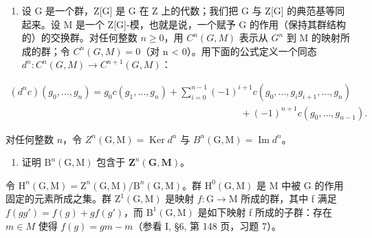 
\begin{enumerate}
\def\labelenumi{\arabic{enumi})}
\tightlist
\item
  设 G 是一个群，Z{[}G{]} 是 G 在 Z 上的代数；我们把 G 与 Z{[}G{]} 的典范基等同起来。设 M 是一个 Z{[}G{]}-模，也就是说，一个赋予 G 的作用（保持其群结构的）的交换群。对任何整数 \(n \geqslant 0\)，用 \(C^{n}(G, M)\) 表示从 \(G^{n}\) 到 M 的映射所成的群；令 \(C^{n}(G, M) = 0\)（对 n \textless{} 0）。用下面的公式定义一个同态 \(d^{n}: C^{n}(G, M) \to C^{n+1}(G, M)\)：
\end{enumerate}

\[
\begin{array}{c} (d ^ {n} c) (g _ {0}, \ldots , g _ {n}) = g _ {0}   c (g _ {1}, \ldots , g _ {n}) + \sum_ {i = 0} ^ {n - 1} (- 1) ^ {i + 1} c (g _ {0}, \ldots , g _ {i} g _ {i + 1}, \ldots , g _ {n}) \\ \qquad \qquad \qquad \qquad \qquad \qquad \qquad \qquad \qquad \qquad \qquad \qquad + (- 1) ^ {n + 1} c (g _ {0}, \ldots , g _ {n - 1})  . \end{array}
\]

对任何整数 \(n\)，令 \(Z^n(\mathrm{G},\mathrm{M}) = \operatorname{Ker} d^n\) 与 \(B^n(\mathrm{G},\mathrm{M}) = \operatorname{Im} d^n\)。

\begin{enumerate}
\def\labelenumi{\alph{enumi})}
\tightlist
\item
  证明 \(\mathrm{B}^n (\mathrm{G},\mathrm{M})\) 包含于 \(\mathbf{Z}^n (\mathbf{G},\mathbf{M})\)。
\end{enumerate}

令 \(\mathrm{H}^{n}(\mathrm{G},\mathrm{M})=\mathrm{Z}^{n}(\mathrm{G},\mathrm{M})/\mathrm{B}^{n}(\mathrm{G},\mathrm{M})\)。群 \(\mathrm{H}^{0}(\mathrm{G},\mathrm{M})\) 是 M 中被 G 的作用固定的元素所成之集。群 \(\mathrm{Z}^{1}(\mathrm{G},\mathrm{M})\) 是映射 \(f:\mathrm{G}\to\mathrm{M}\) 所成的群，其中 f 满足 \(f(gg')=f(g)+gf(g')\)，而 \(\mathrm{B}^{1}(\mathrm{G},\mathrm{M})\) 是如下映射 f 所成的子群：存在 \(m\in M\) 使得 \(f(g)=gm-m\)（参看 I, §6, 第 148 页，习题 7）。

